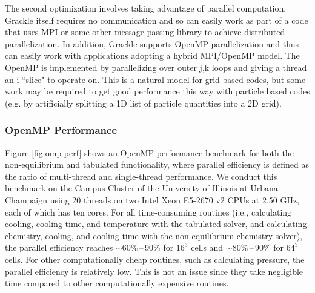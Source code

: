 The second optimization involves taking advantage of parallel computation.  Grackle itself requires no communication and so can easily work as part of a code that uses MPI or some other message passing library to achieve distributed parallelization.  In addition, Grackle supports OpenMP parallelization and thus can easily work with applications adopting a hybrid MPI/OpenMP model.  The OpenMP is implemented by parallelizing over outer j,k loops and giving a thread an i ``slice" to operate on.  This is a natural model for grid-based codes, but some work may be required to get good performance this way with particle based codes (e.g. by artificially splitting a 1D list of particle quantities into a 2D grid).

\subsubsection{OpenMP Performance}


Figure \ref{fig:omp-perf} shows an OpenMP performance benchmark for both the
non-equilibrium and tabulated functionality, where parallel efficiency is
defined as the ratio of multi-thread and single-thread performance. We
conduct this benchmark on the Campus Cluster of the University of Illinois
at Urbana-Champaign using 20 threads on two Intel Xeon E5-2670 v2 CPUs
at 2.50 GHz, each of which has ten cores. For all time-consuming routines
(i.e., calculating cooling, cooling time, and temperature with the tabulated
solver, and calculating chemistry, cooling, and cooling time with the
non-equilibrium chemistry solver), the parallel efficiency reaches
$\sim 60\%\,\text{--}\,90\%$ for $16^3$ cells and
$\sim 80\%\,\text{--}\,90\%$ for $64^3$ cells. For other computationally cheap
routines, such as calculating pressure, the parallel efficiency is relatively
low. This is not an issue since they take negligible time compared to other
computationally expensive routines.

